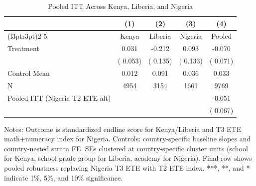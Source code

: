 \begin{table}[!htbp]
\centering
\caption{Pooled ITT Across Kenya, Liberia, and Nigeria}
\label{tab:pooled_itt}
\begin{threeparttable}
\begin{tabular}[t]{lcccc}
\toprule
 & (1) & (2) & (3) & (4) \\
\cmidrule(l{3pt}r{3pt}){2-5}
 & Kenya & Liberia & Nigeria & Pooled \\
\midrule
Treatment &   0.031 &  -0.212 &   0.093 &  -0.070 \\
 & (  0.053) & (  0.135) & (  0.133) & (  0.071) \\
\addlinespace
Control Mean &   0.012 &   0.091 &   0.036 &   0.033 \\
N & 4954 & 3154 & 1661 & 9769 \\
\addlinespace
Pooled ITT (Nigeria T2 ETE alt) & \multicolumn{3}{c}{ } &  -0.051 \\
 & \multicolumn{3}{c}{ } & (  0.067) \\
\bottomrule
\end{tabular}
\begin{tablenotes}[para]
\item Notes: Outcome is standardized endline score for Kenya/Liberia and T3 ETE math+numeracy index for Nigeria. 
Controls: country-specific baseline slopes and country-nested strata FE. 
SEs clustered at country-specific cluster units (school for Kenya, school\mbox{-}grade\mbox{-}group for Liberia, academy for Nigeria). 
Final row shows pooled robustness replacing Nigeria T3 ETE with T2 ETE index. 
***, **, and * indicate 1\%, 5\%, and 10\% significance.
\end{tablenotes}
\end{threeparttable}
\end{table}
